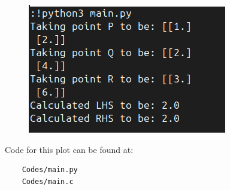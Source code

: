\documentclass[journal]{IEEEtran}
\begin{document}
\begin{figure}[H]
	\centering
	\includegraphics[width=0.75\columnwidth]{Figures/output.png}
	\label{fig}
\end{figure}

Code for this plot can be found at:
\begin{lstlisting}
    Codes/main.py
    Codes/main.c
\end{lstlisting}
\end{document}
